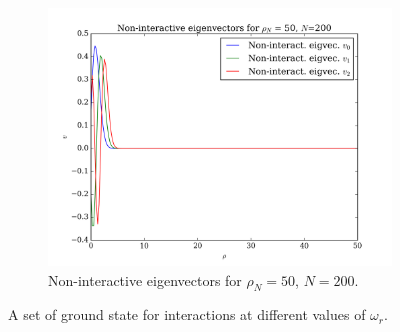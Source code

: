 \documentclass[11pt,a4paper,notitlepage]{article}
\begin{document}
\begin{figure}[H]
\begin{subfigure}[t]{0.45\textwidth}
		\includegraphics[scale=0.40]{../non_interacting_eigvec_plot_rhoN=50_N=200.png}
		\caption{Non-interactive eigenvectors for $\rho_N = 50$, $N = 200$.}\label{fig:eigvecs-non-interact-50-200}
\end{subfigure}
	\caption{A set of ground state for interactions at different values of $\omega_r$.}\label{fig:eigvecs-non-interact}
\end{figure}
\end{document}
